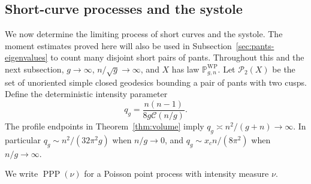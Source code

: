 \subsection{Short-curve processes and the systole}
\label{sec:pants-spectrum}

We now determine the limiting process of short curves and the systole.
The moment estimates proved here will also be used in
Subsection~\ref{sec:pants-eigenvalues} to count many disjoint short pairs of pants.
Throughout this and the next subsection,
$g\to\infty$, $n/\sqrt g\to\infty$, and $X$ has law
$\mathbb P^{\mathrm{WP}}_{g,n}$. Let $\mathcal P_2(X)$ be the set of
unoriented simple closed geodesics bounding a pair of pants with two
cusps. Define the deterministic intensity parameter
\begin{equation}
 q_g=\frac{n(n-1)}{8g\mathcal C(n/g)}.
 \label{eq:PS1}
\end{equation}
The profile endpoints in Theorem~\ref{thm:volume} imply
$q_g\asymp n^2/(g+n)\to\infty$. In particular
$q_g\sim n^2/(32\pi^2g)$ when $n/g\to0$, and
$q_g\sim x_cn/(8\pi^2)$ when $n/g\to\infty$.

We write $\operatorname{PPP}(\nu)$ for a Poisson point process with intensity measure $\nu$.

